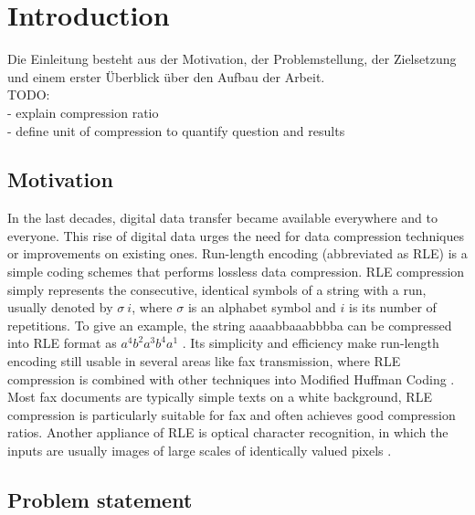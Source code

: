 
\chapter{Introduction}
\label{ch:Introduction}
Die Einleitung besteht aus der Motivation, der Problemstellung, der Zielsetzung und einem erster Überblick über den Aufbau der Arbeit. \\
TODO: \\
- explain compression ratio \\
- define unit of compression to quantify question and results \\

\section{Motivation}
\label{ch:Introduction:sec:Motivation}

In the last decades, digital data transfer became available everywhere and to everyone. This rise of digital data urges the need for data compression techniques or improvements on existing ones. Run-length encoding \cite{rle-patent} (abbreviated as RLE) is a simple coding schemes that performs lossless data compression. RLE compression simply represents the consecutive, identical symbols of
a string with a run, usually denoted by $\sigma \ i$, where $\sigma$ is an alphabet symbol and $i$ is its number of repetitions. To give an example, the string aaaabbaaabbbba can be compressed into RLE format as  $ a^{4}b^{2}a^{3}b^{4}a^{1}$ . Its simplicity and efficiency make run-length encoding still usable in several areas like fax transmission, where RLE compression is combined with other techniques into Modified Huffman Coding \cite{fax-rle}. Most fax documents are typically simple texts on a white background, RLE compression is particularly suitable for fax and often achieves good compression ratios. Another appliance of RLE is optical character recognition, in which the inputs are usually images of large scales of identically valued pixels \cite{rle-bio}.

\section{Problem statement}
\label{ch:Introduction:sec:Problem statement}

